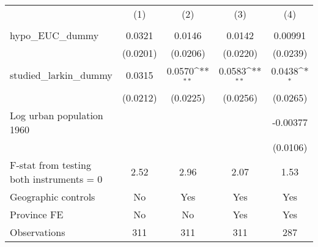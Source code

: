 {
\def\sym#1{\ifmmode^{#1}\else\(^{#1}\)\fi}
\begin{tabular}{l*{4}{c}}
\hline\hline
                &\multicolumn{1}{c}{(1)}&\multicolumn{1}{c}{(2)}&\multicolumn{1}{c}{(3)}&\multicolumn{1}{c}{(4)}\\
                &\multicolumn{1}{c}{}&\multicolumn{1}{c}{}&\multicolumn{1}{c}{}&\multicolumn{1}{c}{}\\
\hline
hypo\_EUC\_dummy  &   0.0321         &   0.0146         &   0.0142         &  0.00991         \\
                & (0.0201)         & (0.0206)         & (0.0220)         & (0.0239)         \\
[1em]
studied\_larkin\_dummy&   0.0315         &   0.0570\sym{**} &   0.0583\sym{**} &   0.0438\sym{*}  \\
                & (0.0212)         & (0.0225)         & (0.0256)         & (0.0265)         \\
[1em]
Log urban population 1960&                  &                  &                  & -0.00377         \\
                &                  &                  &                  & (0.0106)         \\
\hline
F-stat from testing both instruments = 0&     2.52         &     2.96         &     2.07         &     1.53         \\
Geographic controls&       No         &      Yes         &      Yes         &      Yes         \\
Province FE     &       No         &       No         &      Yes         &      Yes         \\
Observations    &      311         &      311         &      311         &      287         \\
\hline\hline
\end{tabular}
}

